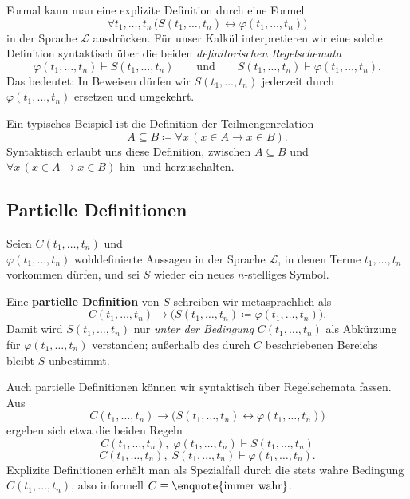 \documentclass[main.tex]{subfiles}
\begin{document}
\begin{remark}
Formal kann man eine explizite Definition durch eine Formel
\[
  \forall t_1,\dots,t_n\,
    \bigl( S(t_1,\dots,t_n) \leftrightarrow
           \varphi(t_1,\dots,t_n) \bigr)
\]
in der Sprache \(\mathcal L\) ausdrücken. Für unser Kalkül
interpretieren wir eine solche Definition syntaktisch über die
beiden \emph{definitorischen Regelschemata}
\[
  \varphi(t_1,\dots,t_n) \vdash S(t_1,\dots,t_n)
  \qquad\text{und}\qquad
  S(t_1,\dots,t_n) \vdash \varphi(t_1,\dots,t_n).
\]
Das bedeutet: In Beweisen dürfen wir \(S(t_1,\dots,t_n)\)
jederzeit durch\\ \(\varphi(t_1,\dots,t_n)\) ersetzen und umgekehrt.

Ein typisches Beispiel ist die Definition der Teilmengenrelation
\[
  A \subseteq B \coloneqq \forall x\,(x\in A \rightarrow x\in B).
\]
Syntaktisch erlaubt uns diese Definition, zwischen
\(A \subseteq B\) und \(\forall x\,(x\in A \rightarrow x\in B)\)
hin- und herzuschalten.
\end{remark}

\subsection{Partielle Definitionen}

\begin{definition}
Seien \(C(t_1,\dots,t_n)\) und\\ \(\varphi(t_1,\dots,t_n)\) wohldefinierte
Aussagen in der Sprache \(\mathcal L\), in denen Terme
\(t_1,\dots,t_n\) vorkommen dürfen, und sei \(S\) wieder ein neues
\(n\)-stelliges Symbol.

Eine \textbf{partielle Definition} von \(S\) schreiben wir
metasprachlich als
\[
  C(t_1,\dots,t_n) \rightarrow
  \bigl(S(t_1,\dots,t_n) \coloneqq \varphi(t_1,\dots,t_n)\bigr).
\]
Damit wird \(S(t_1,\dots,t_n)\) nur \emph{unter der Bedingung}
\(C(t_1,\dots,t_n)\) als Abkürzung für \(\varphi(t_1,\dots,t_n)\)
verstanden; außerhalb des durch \(C\) beschriebenen Bereichs bleibt
\(S\) unbestimmt.
\end{definition}

\begin{remark}
Auch partielle Definitionen können wir syntaktisch über
Regelschemata fassen. Aus
\[
  C(t_1,\dots,t_n) \rightarrow
  \bigl(S(t_1,\dots,t_n) \leftrightarrow \varphi(t_1,\dots,t_n)\bigr)
\]
ergeben sich etwa die beiden Regeln
\[
  C(t_1,\dots,t_n),\; \varphi(t_1,\dots,t_n)
    \vdash S(t_1,\dots,t_n)
\]
\[
  C(t_1,\dots,t_n),\; S(t_1,\dots,t_n)
    \vdash \varphi(t_1,\dots,t_n).
\]
Explizite Definitionen erhält man als Spezialfall durch die stets
wahre Bedingung \(C(t_1,\dots,t_n)\), also informell
\(C \equiv \text{\enquote{immer wahr}}\).
\end{remark}
\end{document}
